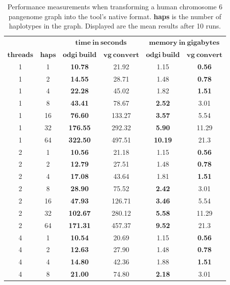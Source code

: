\begin{table}[!ht]
	\centering
	\caption{\label{tab:build} Performance measurements when transforming a human chromosome 6 pangenome graph into the tool's native format. \textbf{haps} is the number of haplotypes in the graph. Displayed are the mean results after 10 runs.}
	\begin{tabular}{@{}cccccc@{}}
		& & \multicolumn{2}{c}{$\mathbf{time\ in\ seconds}$} & \multicolumn{2}{c}{$\mathbf{memory\ in\ gigabytes}$} \\ \cmidrule(lr){3-4} \cmidrule(lr){5-6}
		{$\mathbf{threads}$} & $\mathbf{haps}$ &{$\mathbf{odgi\ build}$} & {$\mathbf{vg\ convert}$} & {$\mathbf{odgi\ build}$} & $\mathbf{vg\ convert}$ \\ \hline
		1 & 1 & \textbf{10.78} & 21.92 & 1.15 & \textbf{0.56} \\
		1 & 2 & \textbf{14.55} & 28.71 & 1.48 & \textbf{0.78} \\ 
		1 & 4 & \textbf{22.28} & 45.02 & 1.82 & \textbf{1.51} \\ 
		1 & 8 & \textbf{43.41} & 78.67 & \textbf{2.52} & 3.01 \\ 
		1 & 16 & \textbf{76.60} & 133.27 & \textbf{3.57} & 5.54 \\ 
		1 & 32 & \textbf{176.55} & 292.32 & \textbf{5.90} & 11.29 \\ 
		1 & 64 & \textbf{322.50} & 497.51 & \textbf{10.19} & 21.3 \\ \midrule
		2 & 1 & \textbf{10.56} & 21.18 & 1.15 & \textbf{0.56} \\ 
		2 & 2 & \textbf{12.79} & 27.51 & 1.48 & \textbf{0.78} \\ 
		2 & 4 & \textbf{17.08} & 43.64 & 1.81 & \textbf{1.51} \\ 
		2 & 8 & \textbf{28.90} & 75.52 & \textbf{2.42} & 3.01 \\ 
		2 & 16 & \textbf{47.93} & 126.71 & \textbf{3.46} & 5.54 \\ 
		2 & 32 & \textbf{102.67} & 280.12 & \textbf{5.58} & 11.29 \\ 
		2 & 64 & \textbf{171.31} & 457.37 & \textbf{9.52} & 21.3 \\ \midrule
		4 & 1 & \textbf{10.54} & 20.69 & 1.15 & \textbf{0.56} \\ 
		4 & 2 & \textbf{12.63} & 27.90 & 1.48 & \textbf{0.78} \\ 
		4 & 4 & \textbf{14.80} & 42.36 & 1.88 & \textbf{1.51} \\ 
		4 & 8 & \textbf{21.00} & 74.80 & \textbf{2.18} & 3.01 \\ 

\end{tabular}
\end{table}
